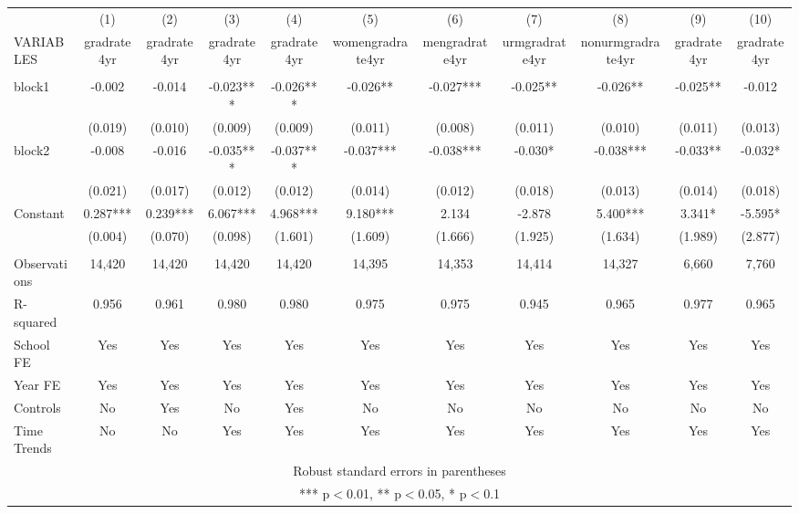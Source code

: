 \documentclass[]{article}
\begin{document}
\begin{tabular}{lcccccccccc} \hline
 & (1) & (2) & (3) & (4) & (5) & (6) & (7) & (8) & (9) & (10) \\
VARIABLES & gradrate4yr & gradrate4yr & gradrate4yr & gradrate4yr & womengradrate4yr & mengradrate4yr & urmgradrate4yr & nonurmgradrate4yr & gradrate4yr & gradrate4yr \\ \hline
 &  &  &  &  &  &  &  &  &  &  \\
block1 & -0.002 & -0.014 & -0.023*** & -0.026*** & -0.026** & -0.027*** & -0.025** & -0.026** & -0.025** & -0.012 \\
 & (0.019) & (0.010) & (0.009) & (0.009) & (0.011) & (0.008) & (0.011) & (0.010) & (0.011) & (0.013) \\
block2 & -0.008 & -0.016 & -0.035*** & -0.037*** & -0.037*** & -0.038*** & -0.030* & -0.038*** & -0.033** & -0.032* \\
 & (0.021) & (0.017) & (0.012) & (0.012) & (0.014) & (0.012) & (0.018) & (0.013) & (0.014) & (0.018) \\
Constant & 0.287*** & 0.239*** & 6.067*** & 4.968*** & 9.180*** & 2.134 & -2.878 & 5.400*** & 3.341* & -5.595* \\
 & (0.004) & (0.070) & (0.098) & (1.601) & (1.609) & (1.666) & (1.925) & (1.634) & (1.989) & (2.877) \\
 &  &  &  &  &  &  &  &  &  &  \\
Observations & 14,420 & 14,420 & 14,420 & 14,420 & 14,395 & 14,353 & 14,414 & 14,327 & 6,660 & 7,760 \\
R-squared & 0.956 & 0.961 & 0.980 & 0.980 & 0.975 & 0.975 & 0.945 & 0.965 & 0.977 & 0.965 \\
School FE & Yes & Yes & Yes & Yes & Yes & Yes & Yes & Yes & Yes & Yes \\
Year FE & Yes & Yes & Yes & Yes & Yes & Yes & Yes & Yes & Yes & Yes \\
Controls & No & Yes & No & Yes & No & No & No & No & No & No \\
 Time Trends & No & No & Yes & Yes & Yes & Yes & Yes & Yes & Yes & Yes \\ \hline
\multicolumn{11}{c}{ Robust standard errors in parentheses} \\
\multicolumn{11}{c}{ *** p$<$0.01, ** p$<$0.05, * p$<$0.1} \\
\end{tabular}
\end{document}
